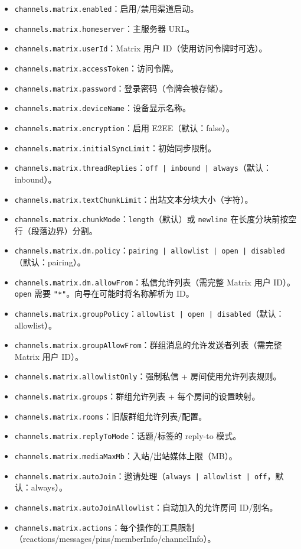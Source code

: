 \begin{itemize}
  \item \texttt{channels.matrix.enabled}：启用/禁用渠道启动。
  \item \texttt{channels.matrix.homeserver}：主服务器 URL。
  \item \texttt{channels.matrix.userId}：Matrix 用户 ID（使用访问令牌时可选）。
  \item \texttt{channels.matrix.accessToken}：访问令牌。
  \item \texttt{channels.matrix.password}：登录密码（令牌会被存储）。
  \item \texttt{channels.matrix.deviceName}：设备显示名称。
  \item \texttt{channels.matrix.encryption}：启用 E2EE（默认：false）。
  \item \texttt{channels.matrix.initialSyncLimit}：初始同步限制。
  \item \texttt{channels.matrix.threadReplies}：\texttt{off | inbound | always}（默认：inbound）。
  \item \texttt{channels.matrix.textChunkLimit}：出站文本分块大小（字符）。
  \item \texttt{channels.matrix.chunkMode}：\texttt{length}（默认）或 \texttt{newline} 在长度分块前按空行（段落边界）分割。
  \item \texttt{channels.matrix.dm.policy}：\texttt{pairing | allowlist | open | disabled}（默认：pairing）。
  \item \texttt{channels.matrix.dm.allowFrom}：私信允许列表（需完整 Matrix 用户 ID）。\texttt{open} 需要 \texttt{"*"}。向导在可能时将名称解析为 ID。
  \item \texttt{channels.matrix.groupPolicy}：\texttt{allowlist | open | disabled}（默认：allowlist）。
  \item \texttt{channels.matrix.groupAllowFrom}：群组消息的允许发送者列表（需完整 Matrix 用户 ID）。
  \item \texttt{channels.matrix.allowlistOnly}：强制私信 + 房间使用允许列表规则。
  \item \texttt{channels.matrix.groups}：群组允许列表 + 每个房间的设置映射。
  \item \texttt{channels.matrix.rooms}：旧版群组允许列表/配置。
  \item \texttt{channels.matrix.replyToMode}：话题/标签的 reply-to 模式。
  \item \texttt{channels.matrix.mediaMaxMb}：入站/出站媒体上限（MB）。
  \item \texttt{channels.matrix.autoJoin}：邀请处理（\texttt{always | allowlist | off}，默认：always）。
  \item \texttt{channels.matrix.autoJoinAllowlist}：自动加入的允许房间 ID/别名。
  \item \texttt{channels.matrix.actions}：每个操作的工具限制（reactions/messages/pins/memberInfo/channelInfo）。
\end{itemize}



